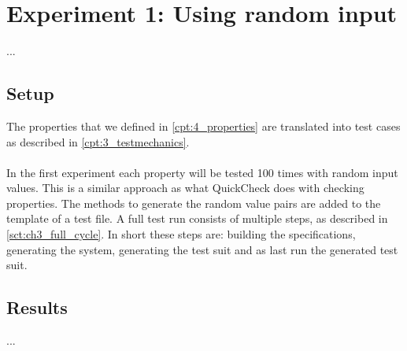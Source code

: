 \chapter{Experiment 1: Using random input}
\label{cpt:experiment1}
... %

\section{Setup}
The properties that we defined in \autoref{cpt:4_properties} are translated into test cases as described in \autoref{cpt:3_testmechanics}.\\
\\
In the first experiment each property will be tested 100 times with random input values. This is a similar approach as what QuickCheck does with checking properties. The methods to generate the random value pairs are added to the template of a test file. A full test run consists of multiple steps, as described in \autoref{sct:ch3_full_cycle}. In short these steps are: building the specifications, generating the system, generating the test suit and as last run the generated test suit.

\section{Results}
... %

